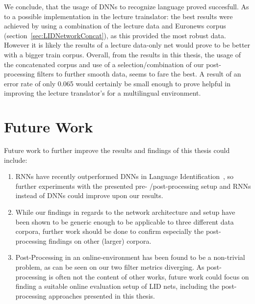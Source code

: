 We conclude, that the usage of DNNs to recognize language proved succesfull. As to a possible implementation in the lecture trainslator: the best results were achieved by using a combination of the lecture data and Euronews corpus (section~\ref{sec:LIDNetworkConcat}), as this provided the most robust data. However it is likely the results of a lecture data-only net would prove to be better with a bigger train corpus. Overall, from the results in this thesis, the usage of the concatenated corpus and use of a selection/combination of our post-processing filters to further smooth data, seems to fare the best. A result of an error rate of only 0.065 would certainly be small enough to prove helpful in improving the lecture translator's for a multilingual environment.

\section{Future Work}
\label{sec:fw}

Future work to further improve the results and findings of this thesis could include:

\begin{enumerate}
\item RNNs have recently outperformed DNNs in Language Identification~\cite{gonzalez2014automatic}, so further experiments with the presented pre- /post-processing setup and RNNs instead of DNNs could improve upon our results.
\item While our findings in regards to the network architecture and setup have been shown to be generic enough to be applicable to three different data corpora, further work should be done to confirm especially the post-processing findings on other (larger) corpora.
\item Post-Processing in an online-environment has been found to be a non-trivial problem, as can be seen on our two filter metrics diverging. As post-processing is often not the content of other works, future work could focus on finding a suitable online evaluation setup of LID nets, including the post-processing approaches presented in this thesis.
\end{enumerate}